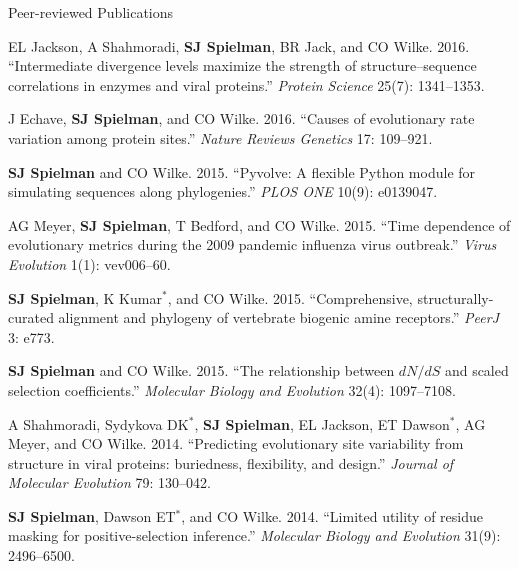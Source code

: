 \documentclass{resume} %
\begin{document}
\begin{rSection}{Peer-reviewed Publications}
\begin{etaremune}[leftmargin=1.5em]
\item EL Jackson, A Shahmoradi, \textbf{SJ Spielman}, BR Jack, and CO Wilke. 2016. ``Intermediate divergence levels maximize the strength of structure--sequence correlations in enzymes and viral proteins.'' \emph{Protein Science} 25(7): 1341--1353.\\


\item J Echave, \textbf{SJ Spielman}, and CO Wilke. 2016. ``Causes of evolutionary rate variation among protein sites.'' \emph{Nature Reviews Genetics} 17: 109--921.\\


\item \textbf{SJ Spielman} and CO Wilke. 2015. ``Pyvolve: A flexible Python module for simulating sequences along phylogenies.'' \emph{PLOS ONE} 10(9): e0139047.\\


\item AG Meyer, \textbf{SJ Spielman}, T Bedford, and CO Wilke. 2015. ``Time dependence of evolutionary metrics during the 2009 pandemic influenza virus outbreak.'' \emph{Virus Evolution} 1(1): vev006--60. \\


\item \textbf{SJ Spielman}, K Kumar$^\ast$, and CO Wilke. 2015. ``Comprehensive, structurally-curated alignment and phylogeny of vertebrate biogenic amine receptors.'' \emph{PeerJ} 3: e773. \\


\item \textbf{SJ Spielman} and CO Wilke. 2015. ``The relationship between $dN/dS$ and scaled selection coefficients.'' \emph{Molecular Biology and Evolution} 32(4): 1097--7108.\\


\item A Shahmoradi, Sydykova DK$^\ast$, \textbf{SJ Spielman}, EL Jackson, ET Dawson$^\ast$, AG Meyer, and CO Wilke. 2014. ``Predicting evolutionary site variability from structure in viral proteins: buriedness, flexibility, and design.'' \emph{Journal of Molecular Evolution} 79: 130--042. \\


\item \textbf{SJ Spielman}, Dawson ET$^\ast$, and CO Wilke. 2014. ``Limited utility of residue masking for positive-selection inference.'' \emph{Molecular Biology and Evolution} 31(9): 2496--6500. \\



\end{etaremune}
\end{rSection}
\end{document}

